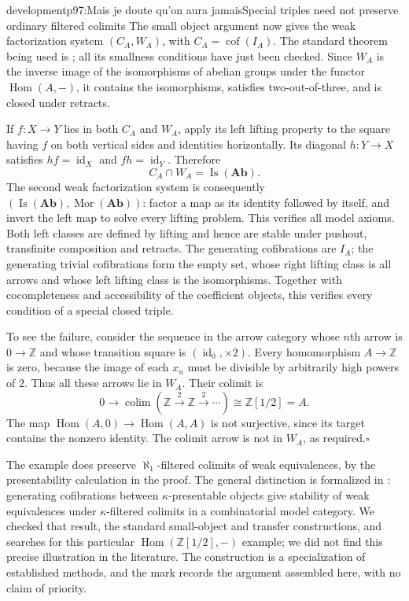 \begin{dcomment}{development}{p97:Mais je doute qu'on aura jamais}{Special triples need not preserve ordinary filtered colimits}
The small object argument now gives the weak factorization system $(C_A,W_A)$, with $C_A=\operatorname{cof}(I_A)$. The standard theorem being used is \citet[Theorem~2.1.14]{Hovey1999}; all its smallness conditions have just been checked. Since $W_A$ is the inverse image of the isomorphisms of abelian groups under the functor $\operatorname{Hom}(A,-)$, it contains the isomorphisms, satisfies two-out-of-three, and is closed under retracts.

If $f:X\to Y$ lies in both $C_A$ and $W_A$, apply its left lifting property to the square having $f$ on both vertical sides and identities horizontally. Its diagonal $h:Y\to X$ satisfies $hf=\operatorname{id}_X$ and $fh=\operatorname{id}_Y$. Therefore
\[
 C_A\cap W_A=\operatorname{Is}(\mathbf{Ab}).
\]
The second weak factorization system is consequently $(\operatorname{Is}(\mathbf{Ab}),\operatorname{Mor}(\mathbf{Ab}))$: factor a map as its identity followed by itself, and invert the left map to solve every lifting problem. This verifies all model axioms. Both left classes are defined by lifting and hence are stable under pushout, transfinite composition and retracts. The generating cofibrations are $I_A$; the generating trivial cofibrations form the empty set, whose right lifting class is all arrows and whose left lifting class is the isomorphisms. Together with cocompleteness and accessibility of the coefficient objects, this verifies every condition of a special closed triple.

To see the failure, consider the sequence in the arrow category whose $n$th arrow is $0\to\mathbb Z$ and whose transition square is $(\operatorname{id}_0,\times2)$. Every homomorphism $A\to\mathbb Z$ is zero, because the image of each $x_n$ must be divisible by arbitrarily high powers of $2$. Thus all these arrows lie in $W_A$. Their colimit is
\[
 0\longrightarrow
 \operatorname*{colim}(\mathbb Z\xrightarrow{2}\mathbb Z
              \xrightarrow{2}\cdots)
 \cong\mathbb Z[1/2]=A.
\]
The map $\operatorname{Hom}(A,0)\to\operatorname{Hom}(A,A)$ is not surjective, since its target contains the nonzero identity. The colimit arrow is not in $W_A$, as required.\hfill$\square$

The example does preserve $\aleph_1$-filtered colimits of weak equivalences, by the presentability calculation in the proof. The general distinction is formalized in \citet[Proposition~4.1]{RaptisRosicky2015}: generating cofibrations between $\kappa$-presentable objects give stability of weak equivalences under $\kappa$-filtered colimits in a combinatorial model category. We checked that result, the standard small-object and transfer constructions, and searches for this particular $\operatorname{Hom}(\mathbb Z[1/2],-)$ example; we did not find this precise illustration in the literature. The construction is a specialization of established methods, and the mark \ours{} records the argument assembled here, with no claim of priority.
\end{dcomment}


